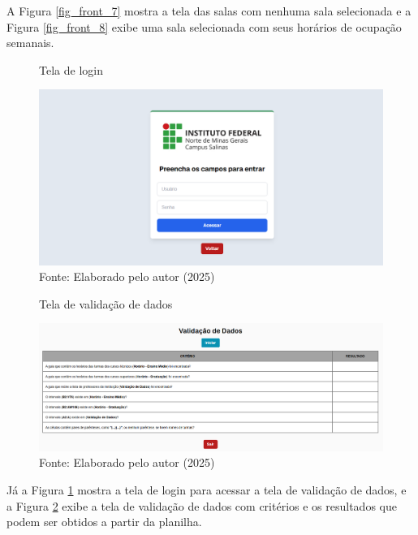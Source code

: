 A Figura \ref{fig_front_7} mostra a tela das salas com nenhuma sala selecionada e a Figura \ref{fig_front_8} exibe uma sala selecionada com seus horários de ocupação semanais.

\begin{figure}[htb]
    \centering
    \caption{Tela de login}
    \includegraphics[width=1\textwidth]{Figuras/front-9.png}
    \caption*{Fonte: Elaborado pelo autor (2025)}
    \label{fig_front_9}
\end{figure}

\begin{figure}[H]
    \centering
    \caption{Tela de validação de dados}
    \includegraphics[width=1\textwidth]{Figuras/front-10.png}
    \caption*{Fonte: Elaborado pelo autor (2025)}
    \label{fig_front_10}
\end{figure}

Já a Figura \ref{fig_front_9} mostra a tela de login para acessar a tela de validação de dados, e a Figura \ref{fig_front_10} exibe a tela de validação de dados com critérios e os resultados que podem ser obtidos a partir da planilha.

